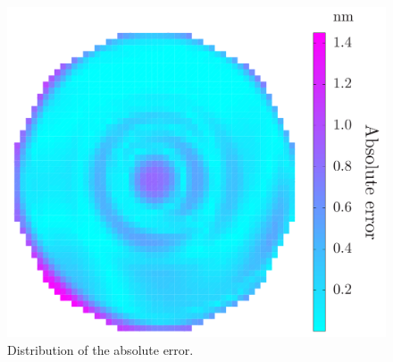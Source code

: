 \begin{figure}[b]
  \centering
  \vspace{-1.5em}
  \includegraphics[width=0.6\linewidth]{include/figures/wafer-qoi-error.pdf}
  \caption{Distribution of the absolute error.}
\end{figure}
